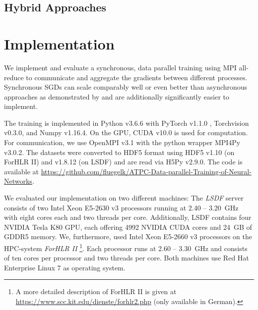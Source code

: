 \documentclass[conference,compsoc,a4paper]{IEEEtran}
\begin{document}

\subsection{Hybrid Approaches} %
\label{sub:hybrid_approaches}





\section{Implementation} %
\label{sec:implementation}
We implement and evaluate a synchronous, data parallel training using MPI all-reduce to communicate and aggregate the gradients between different processes.
Synchronous SGDs can scale comparably well or even better than asynchronous approaches as demonstrated by \cite{jin2016-How-to-scale,chen2016-Revisiting-distributed-synchronous-SGD} and are additionally significantly easier to implement.

The training is implemented in Python v3.6.6 with PyTorch v1.1.0 \cite{paszke2017automatic}, Torchvision v0.3.0, and Numpy v1.16.4.
On the GPU, CUDA v10.0 is used for computation.
For communication, we use OpenMPI v3.1 with the python wrapper MPI4Py v3.0.2.
The datasets were converted to HDF5 format using HDF5 v1.10 (on ForHLR II) and v1.8.12 (on LSDF) and are read via H5Py v2.9.0.
The code is available at \url{https://github.com/fluegelk/ATPC-Data-parallel-Training-of-Neural-Networks}.

We evaluated our implementation on two different machines:
The \emph{LSDF} server consists of two Intel Xeon E5-2630 v3 processors running at 2.40 – 3.20~GHz with eight cores each and two threads per core.
Additionally, LSDF contains four NVIDIA Tesla K80 GPU, each offering 4992 NVIDIA CUDA cores and 24~GB of GDDR5 memory.
%
We, furthermore, used Intel Xeon E5-2660 v3 processors on the HPC-system \emph{ForHLR II}
\footnote{A more detailed description of ForHLR II is given at \url{https://www.scc.kit.edu/dienste/forhlr2.php} (only available in German).}.
Each processor runs at 2.60 – 3.30~GHz and consists of ten cores per processor and two threads per core.
%
Both machines use Red Hat Enterprise Linux 7 as operating system.
\end{document}

